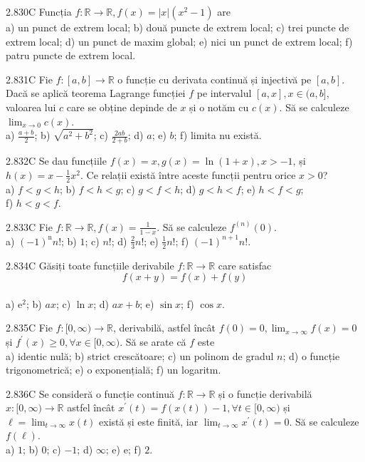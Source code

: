 \documentclass[11pt]{article}
\begin{document}
2.830C Funcția $f: \mathbb{R} \rightarrow \mathbb{R}, f(x)=|x|\left(x^{2}-1\right)$ are\\ a) un punct de extrem local; b) două puncte de extrem local; c) trei puncte de extrem local; d) un punct de maxim global; e) nici un punct de extrem local; f) patru puncte de extrem local.

2.831C Fie $f:[a, b] \rightarrow \mathbb{R}$ o funcție cu derivata continuă și injectivă pe $[a, b]$. Dacă se aplică teorema Lagrange funcției $f$ pe intervalul $[a, x], x \in(a, b]$, valoarea lui $c$ care se obține depinde de $x$ și o notăm cu $c(x)$. Să se calculeze $\lim _{x \rightarrow 0} c(x)$.\\ a) $\frac{a+b}{2}$; b) $\sqrt{a^{2}+b^{2}}$; c) $\frac{2 a b}{2+b}$; d) $a$; e) $b$; f) limita nu există.

2.832C Se dau funcțiile $f(x)=x, g(x)=\ln (1+x), x>-1$, și $h(x)=x-\frac{1}{2} x^{2}$. Ce relații există între aceste funcții pentru orice $x>0$?\\ a) $f<g<h$; b) $f<h<g$; c) $g<f<h$; d) $g<h<f$; e) $h<f<g$;\\ f) $h<g<f$.

2.833C Fie $f: \mathbb{R} \rightarrow \mathbb{R}, f(x)=\frac{1}{1-x}$. Să se calculeze $f^{(n)}(0)$.\\ a) $(-1)^{\mathrm{n}} n!$; b) $1$; c) $n!$; d) $\frac{2}{3} n!$; e) $\frac{1}{2} n!$; f) $(-1)^{n+1} n!$.

2.834C Găsiți toate funcțiile derivabile $f: \mathbb{R} \rightarrow \mathbb{R}$ care satisfac $$f(x+y)=f(x)+f(y)$$\\ a) $\mathrm{e}^{2}$; b) $a x$; c) $\ln x$; d) $a x+b$; e) $\sin x$; f) $\cos x$.

2.835C Fie $f:[0, \infty) \rightarrow \mathbb{R}$, derivabilă, astfel încât $f(0)=0, \lim _{x \rightarrow \infty} f(x)=0$ și $f^{\prime}(x) \geq 0, \forall x \in[0, \infty)$. Să se arate că $f$ este\\ a) identic nulă; b) strict crescătoare; c) un polinom de gradul $n$; d) o funcție trigonometrică; e) o exponențială; f) un logaritm.

2.836C Se consideră o funcție continuă $f: \mathbb{R} \rightarrow \mathbb{R}$ și o funcție derivabilă $x:[0, \infty) \rightarrow \mathbb{R}$ astfel încât $x^{\prime}(t)=f(x(t))-1, \forall t \in[0, \infty)$ și $\ell=\lim _{t \rightarrow \infty} x(t)$ există și este finită, iar $\lim _{t \rightarrow \infty} x^{\prime}(t)=0$. Să se calculeze $f(\ell)$.\\ a) $1$; b) $0$; c) $-1$; d) $\infty$; e) $\mathrm{e}$; f) $2$.
\end{document}
